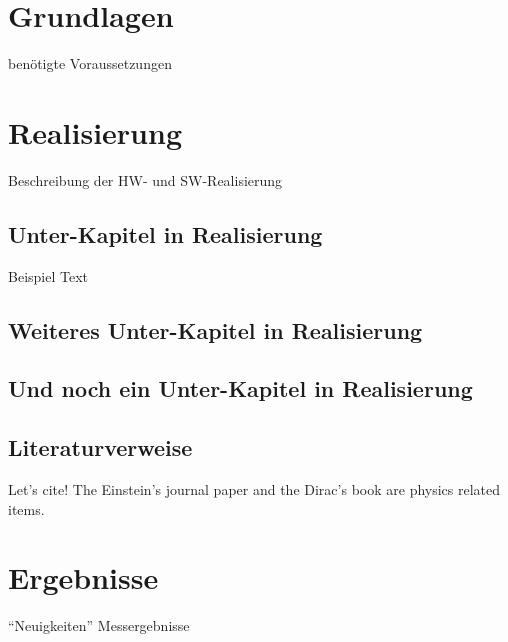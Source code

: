 
\chapter{Grundlagen}
\label{sec:grundl}
benötigte Voraussetzungen

\chapter{Realisierung}
\label{sec:real}
Beschreibung der HW- und SW-Realisierung

\section{Unter-Kapitel in Realisierung}
\label{sec:real-unter}
Beispiel Text


\newpage
\section{Weiteres Unter-Kapitel in Realisierung}
\label{sec:real-unterWeiter}

\newpage
\section{Und noch ein Unter-Kapitel in Realisierung}
\label{sec:real-unterWeiterNoch}

\section{Literaturverweise}
\label{sec:real-literatur}

Let's cite! The Einstein's journal paper \cite{einstein} and the Dirac's
book \cite{melzer.2010} are physics related items.

\chapter{Ergebnisse}
\label{sec:ergeb}
\enquote{Neuigkeiten} Messergebnisse
